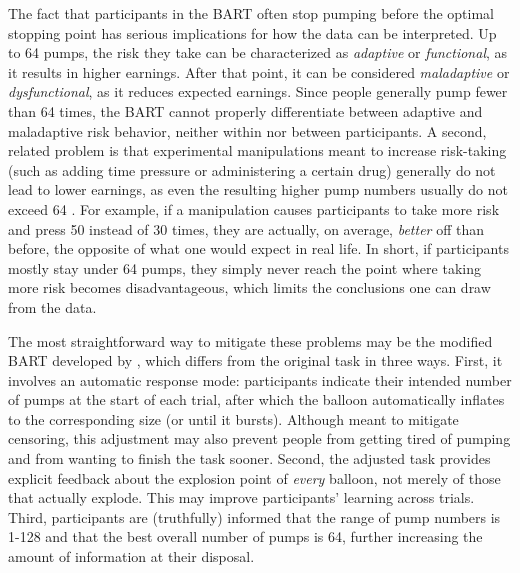 \documentclass[serif, twocolumn, authordate, meta]{jote-article}
\begin{document}
The fact that participants in the BART often stop pumping before the optimal stopping point has serious implications for how the data can be interpreted. Up to 64 pumps, the risk they take can be characterized as \emph{adaptive} or \emph{functional}, as it results in higher earnings. After that point, it can be considered \emph{maladaptive} or \emph{dysfunctional}, as it reduces expected earnings. Since people generally pump fewer than 64 times, the BART cannot properly differentiate between adaptive and maladaptive risk behavior, neither within nor between participants. A second, related problem is that experimental manipulations meant to increase risk-taking (such as adding time pressure or administering a certain drug) generally do not lead to lower earnings, as even the resulting higher pump numbers usually do not exceed 64 \parencite{Pleskac2008}. For example, if a manipulation causes participants to take more risk and press 50 instead of 30 times, they are actually, on average, \emph{better} off than before, the opposite of what one would expect in real life. In short, if participants mostly stay under 64 pumps, they simply never reach the point where taking more risk becomes disadvantageous, which limits the conclusions one can draw from the data.

The most straightforward way to mitigate these problems may be the modified BART developed by \textcite{Pleskac2008}, which differs from the original task in three ways. First, it involves an automatic response mode: participants indicate their intended number of pumps at the start of each trial, after which the balloon automatically inflates to the corresponding size (or until it bursts). Although meant to mitigate censoring, this adjustment may also prevent people from getting tired of pumping and from wanting to finish the task sooner. Second, the adjusted task provides explicit feedback about the explosion point of \emph{every} balloon, not merely of those that actually explode. This may improve participants' learning across trials. Third, participants are (truthfully) informed that the range of pump numbers is 1-128 and that the best overall number of pumps is 64, further increasing the amount of information at their disposal.
\end{document}
